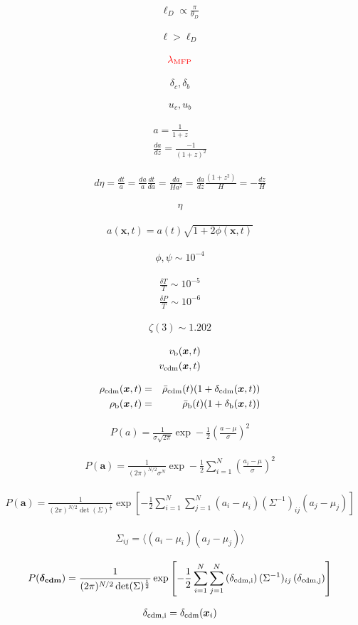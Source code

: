 \documentclass[a4paper, 11pt]{article}
\def\ba{\begin{eqnarray}}
\def\ea{\end{eqnarray}}
\newcommand{\red}[1]{{\color{red}#1}}
\begin{document}
\ba
\ell_{D} \propto \frac{\pi}{\theta_{D}}
\ea

\ba
\ell > \ell_{D}
\ea

\ba
\red{\lambda_{\rm MFP}}
\ea

\ba
\delta_{c}, \delta_{b}
\ea

\ba
u_{c}, u_{b}
\ea

\ba
a = \frac{1}{1+z} \\
\frac{da}{dz} =  \frac{-1}{(1+z)^{2}}
\ea

\ba
d\eta = \frac{dt}{a} = \frac{da}{a}\frac{dt}{da}  = \frac{da}{Ha^{2}} = \frac{da}{dz}\frac{(1+z^{2})}{H} = - \frac{dz}{H} 
\ea

\ba
\eta
\ea

\ba
a(\bm{x},t) = a(t) \sqrt{1 + 2 \phi(\bm{x},t) }
\ea

\ba
\phi, \psi \sim 10^{-4}
\ea

\ba
\frac{\delta{T}}{T} \sim 10^{-5} \\
\frac{\delta{P}}{T} \sim 10^{-6}
\ea

\ba
\zeta(3) \sim 1.202
\ea

\ba
v_{\rm b}  (\bm{x}, t) \\
v_{\rm cdm}  (\bm{x}, t)
\ea

\ba
\rho_{\rm cdm} (\bm{x}, t) &=& \bar{\rho}_{\rm cdm} (t) ( 1 + \delta_{\rm cdm} (\bm{x}, t)) \\
\rho_{\rm b} (\bm{x}, t) &=& \bar{\rho}_{\rm b} (t) ( 1 + \delta_{\rm b} (\bm{x}, t))
\ea

\ba
P(a) = \frac{1}{\sigma \sqrt{2\pi}} \exp - \frac{1}{2} \left( \frac{a-\mu}{\sigma} \right)^{2}
\ea

\ba
P(\bm{a}) = \frac{1}{(2\pi)^{N/2} \sigma^{N}} \exp - \frac{1}{2} \sum^{N}_{i=1} \left( \frac{a_{i}-\mu}{\sigma} \right)^{2}
\ea

\ba
P(\bm{a}) = \frac{1}{(2\pi)^{N/2} \det (\Sigma)^\frac{1}{2}} \exp \left[- \frac{1}{2}  \sum^{N}_{i=1} \sum^{N}_{j=1}  \left(a_{i}-\mu_{i} \right) (\Sigma^{-1})_{ij} \left(a_{j}-\mu_{j} \right) \right]
\ea

\ba
\Sigma_{ij} = \langle \left(a_{i}-\mu_{i} \right) \left(a_{j}-\mu_{j} \right) \rangle
\ea

\ba
P(\bm{\delta_{\rm cdm}}) = \frac{1}{(2\pi)^{N/2} \det (\Sigma)^\frac{1}{2}} \exp \left[- \frac{1}{2}  \sum^{N}_{i=1} \sum^{N}_{j=1}  \left(\delta_{\rm cdm, i} \right) (\Sigma^{-1})_{ij} \left(\delta_{\rm cdm, j} \right) \right]
\ea

\ba
\delta_{\rm cdm, i} = \delta_{\rm cdm}(\bm{x}_{i})
\ea
\end{document}
